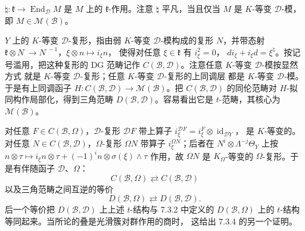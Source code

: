 

$\natural:\mathfrak{k}\to\operatorname{End}_{\mathcal{D}}M$ 是 $M$ 上的
$\mathfrak{k}$-作用。注意 $\natural$ 平凡，当且仅当 $M$ 是 $K$-等变
$\mathcal{D}$-模，即 $M\in\mathcal{M}(\mathcal{B})$。

 $Y$ 上的 $K$-等变 $\mathcal{D}$-复形，指由弱 $K$-等变
$\mathcal{D}$-模构成的复形 $N$，并带态射
$\mathfrak{k}\otimes N^{\cdot}\to N^{\cdot-1}$，$\xi\otimes n\mapsto i_\xi n$，
使得对任意 $\xi\in\mathfrak{k}$ 有 $i_\xi^2=0$，
$di_\xi+i_\xi d=\xi^{\natural}$。按记号滥用，把这种复形的 DG 范畴记作
$C(\mathcal{B},\mathcal{D})$。注意任意 $K$-等变 $\mathcal{D}$-模按显然方式
就是 $K$-等变 $\mathcal{D}$-复形；任意 $K$-等变 $\mathcal{D}$-复形的上同调层
都是 $K$-等变 $\mathcal{D}$-模。于是有上同调函子
$H:C(\mathcal{B},\mathcal{D})\to\mathcal{M}(\mathcal{B})$。把
$C(\mathcal{B},\mathcal{D})$ 的同伦范畴对 $H$-拟同构作局部化，得到三角范畴
$D(\mathcal{B},\mathcal{D})$。容易看出它是 $t$-范畴，其核心为
$\mathcal{M}(\mathcal{B})$。

对任意 $F\in C(\mathcal{B},\Omega)$，$\mathcal{D}$-复形 $\mathcal{D}F$
带上算子 $i_\xi^{\mathcal{D}F}=i_\xi^F\otimes\operatorname{id}_{\mathcal{D}Y}$，
是 $K$-等变的。对任意 $N\in C(\mathcal{B},\mathcal{D})$，$\Omega$-复形
$\Omega N$ 带算子 $i_\xi^{\Omega N}$；后者在
$N^i\otimes\Lambda^{-j}\Theta_Y$ 上按
$n\otimes\tau\mapsto i_\xi n\otimes\tau+(-1)^in\otimes\sigma(\xi)\wedge\tau$
作用，故 $\Omega N$ 是 $K_\Omega$-等变的 $\Omega$-复形。于是有伴随函子
$\mathcal{D}$、$\Omega$：
\begin{equation}\tag{322}
C(\mathcal{B},\Omega)\rightleftarrows C(\mathcal{B},\mathcal{D})
\end{equation}
以及三角范畴之间互逆的等价
\begin{equation}\tag{323}
D(\mathcal{B},\Omega)\rightleftarrows D(\mathcal{B},\mathcal{D}).
\end{equation}
后一个等价把 $D(\mathcal{B},\mathcal{D})$ 上上述 $t$-结构与 7.3.2 中定义的
$D(\mathcal{B},\Omega)$ 上的 $t$-结构等同起来。当所论的叠是光滑簇对群作用的商时，
这给出 7.3.4 的另一个证明。



